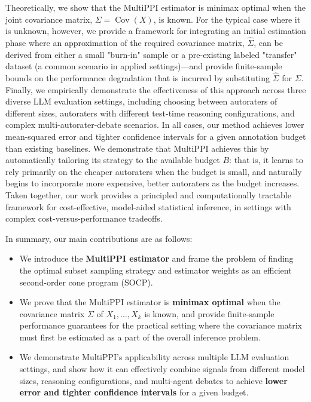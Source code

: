 \documentclass{article} %
\DeclareMathOperator{\Cov}{Cov}
\begin{document}
Theoretically, we show that the MultiPPI estimator is minimax optimal when the joint covariance matrix, ${\Sigma = \Cov(X)}$, is known. For the typical case where it is unknown, however, we provide a  framework for  integrating an initial estimation phase where an approximation of the required covariance matrix, $\widehat{\Sigma}$, can be derived from either a small "burn-in" sample or a pre-existing labeled "transfer" dataset (a common scenario in applied settings)---and  provide finite-sample bounds on the performance degradation that is incurred by substituting $\widehat{\Sigma}$ for  $\Sigma$. Finally,  we empirically demonstrate the effectiveness of this approach across three diverse LLM evaluation settings, including choosing between autoraters of different sizes, autoraters with different test-time reasoning configurations, and complex multi-autorater-debate scenarios. In all cases, our method achieves lower mean-squared error and tighter confidence intervals for a given annotation budget than existing baselines. We demonstrate that MultiPPI achieves this by automatically tailoring its strategy to the available budget $B$: that is,  it learns to rely primarily on the cheaper autoraters when the budget is small, and naturally begins to incorporate more expensive, better autoraters as the budget increases. Taken together, our work provides a principled and computationally tractable framework for cost-effective, model-aided statistical inference, in settings with complex cost-versus-performance tradeoffs.


In summary, our main contributions are as follows:
\begin{itemize}[leftmargin=*]
\item We introduce the \textbf{MultiPPI estimator} and frame the problem of finding the optimal subset sampling strategy and estimator weights as an efficient second-order cone program (SOCP).
\item We prove that the MultiPPI estimator is \textbf{minimax optimal} when the covariance matrix $\Sigma$ of $X_1, \ldots, X_k$ is known, and provide finite-sample performance guarantees for the practical setting where the covariance matrix must first be estimated as a part of the overall inference problem.
\item We demonstrate MultiPPI’s applicability across multiple  LLM evaluation settings, and show how it can effectively combine signals from different model sizes, reasoning configurations, and multi-agent debates to achieve \textbf{lower error and tighter confidence intervals} for a given budget.
\end{itemize}
\end{document}
